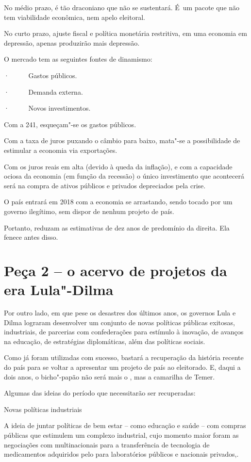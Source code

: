 No médio prazo, é tão draconiano que não se sustentará. É~um pacote que
não tem viabilidade econômica, nem apelo eleitoral.

No curto prazo, ajuste fiscal e política monetária restritiva, em uma
economia em depressão, apenas produzirão mais depressão.

O mercado tem as seguintes fontes de dinamismo:

·~~~~~ Gastos públicos.

·~~~~~ Demanda externa.

·~~~~~ Novos investimentos.

Com a  241, esqueçam"-se os gastos públicos.

Com a taxa de juros puxando o câmbio para baixo, mata"-se a possibilidade
de estimular a economia via exportações.

Com os juros reais em alta (devido à queda da inflação), e com a
capacidade ociosa da economia (em função da recessão) o único
investimento que acontecerá será na compra de ativos públicos e privados
depreciados pela crise.

O país entrará em 2018 com a economia se arrastando, sendo tocado por um
governo ilegítimo, sem dispor de nenhum projeto de país.

Portanto, reduzam as estimativas de dez anos de predomínio da direita.
Ela fenece antes disso.

\section{\textbf{Peça 2 -- o acervo de projetos da era Lula"-Dilma}}

Por outro lado, em que pese os desastres dos últimos anos, os governos
Lula e Dilma lograram desenvolver um conjunto de novas políticas
públicas exitosas, industriais, de parcerias com confederações para
estímulo à inovação, de avanços na educação, de estratégias
diplomáticas, além das políticas sociais.

Como já foram utilizadas com sucesso, bastará a recuperação da história
recente do país para se voltar a apresentar um projeto de país ao
eleitorado. E, daqui a dois anos, o bicho"-papão não será mais o , mas
a camarilha de Temer.

Algumas das ideias do período que necessitarão ser recuperadas:

Novas políticas industriais

A ideia de juntar políticas de bem estar -- como educação e saúde -- com
compras públicas que estimulem um complexo industrial, cujo momento
maior foram as negociações com multinacionais para a transferência de
tecnologia de medicamentos adquiridos pelo  para laboratórios
públicos e nacionais privados,.

